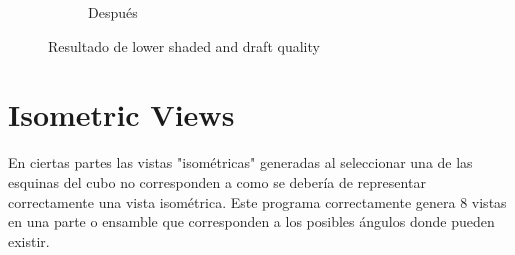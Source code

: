 \documentclass[12pt,letterpaper,final]{report}
\begin{document}
\begin{figure}[H]
\begin{subfigure}[b]{0.45\textwidth}
		\caption{Después}
		\label{fig:solidworksmacro16}
	\end{subfigure}
	\caption{Resultado de lower shaded and draft quality}
\end{figure}


\section{Isometric Views}

En ciertas partes las vistas "isométricas" generadas al seleccionar una de las esquinas del cubo no corresponden a como se debería de representar correctamente una vista isométrica.
Este programa correctamente genera 8 vistas en una parte o ensamble que corresponden a los posibles ángulos donde pueden existir.

\begin{figure}[H]
	\centering

\end{figure}
\end{document}
